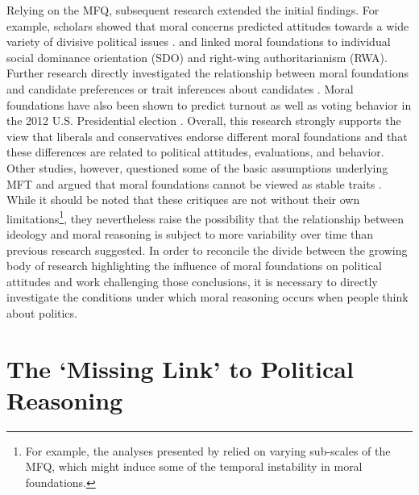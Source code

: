 \documentclass[12pt]{article}
\begin{document}
Relying on the MFQ, subsequent research extended the initial findings. For example, scholars showed that moral concerns predicted attitudes towards a wide variety of divisive political issues \citep[e.g.][]{koleva2012tracing,kertzer2014moral,low2015moral}. \citet{federico2013mapping} and linked moral foundations to individual social dominance orientation (SDO) and right-wing authoritarianism (RWA). Further research directly investigated the relationship between moral foundations and candidate preferences \citep{iyer2010beyond} or trait inferences about candidates \citep{clifford2014linking}. Moral foundations have also been shown to predict turnout \citep{johnson2014ideology} as well as voting behavior in the 2012 U.S. Presidential election \citep{franks2015using}. Overall, this research strongly supports the view that liberals and conservatives endorse different moral foundations and that these differences are related to political attitudes, evaluations, and behavior. Other studies, however, questioned some of the basic assumptions underlying MFT and argued that moral foundations cannot be viewed as stable traits \citep{smith2016intuitive,suhler2011can}. While it should be noted that these critiques are not without their own limitations\footnote{For example, the analyses presented by \citet{smith2016intuitive} relied on varying sub-scales of the MFQ, which might induce some of the temporal instability in moral foundations.}, they nevertheless raise the possibility that the relationship between ideology and moral reasoning is subject to more variability over time than previous research suggested. In order to reconcile the divide between the growing body of research highlighting the influence of moral foundations on political attitudes and work challenging those conclusions, it is necessary to directly investigate the conditions under which moral reasoning occurs when people think about politics.


\section*{The `Missing Link' to Political Reasoning}
\end{document}
